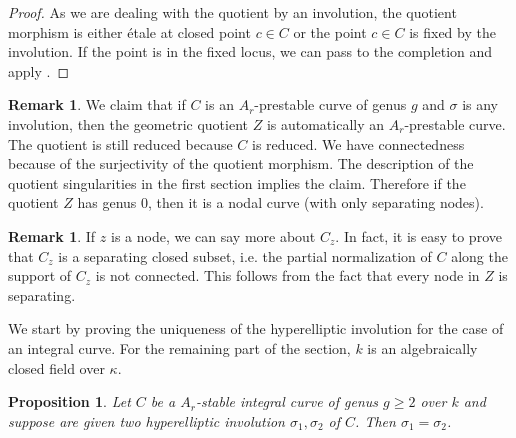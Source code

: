 \documentclass{alggeom}
\numberwithin{equation}{section}
\numberwithin{subsection}{section}
\newtheorem{proposition}[theorem]{Proposition}
\theoremstyle{definition}
\newtheorem{remark}[theorem]{Remark}
\theoremstyle{remark}
\begin{document}
\begin{proof}
	As we are dealing with the quotient by an involution, the quotient morphism is either \'etale at closed point $c\in C$ or the point $c\in C$ is fixed by the involution. If the point is in the fixed locus, we can pass to the completion and apply  . 
\end{proof}
\begin{remark}
	We claim that if $C$ is an $A_r$-prestable curve of genus $g$ and $\sigma$ is any involution, then the geometric quotient $Z$ is automatically an $A_r$-prestable curve. The quotient is still reduced because $C$ is reduced. We have connectedness because of the surjectivity of the quotient morphism. The description of the quotient singularities in the first section implies the claim. Therefore if the quotient $Z$ has genus $0$, then it is a nodal curve 
	(with only separating nodes).
\end{remark}
\begin{remark}
      If $z$ is a node, we can say more about $C_z$. In fact, it is easy to prove that $C_z$ is a separating closed subset, i.e. the partial normalization of $C$ along the support of $C_z$ is not connected. This follows from the fact that every node in $Z$ is separating.
\end{remark}
We start by proving the uniqueness of the hyperelliptic involution for the case of an integral curve. For the remaining part of the section, $k$ is an algebraically closed field over $\kappa$. 

\begin{proposition}\label{prop:integral}
	Let $C$ be a $A_r$-stable integral curve of genus $g\geq 2$ over $k$ and suppose are given two hyperelliptic involution $\sigma_1,\sigma_2$ of $C$. Then $\sigma_1=\sigma_2$. 
\end{proposition}
\end{document}
